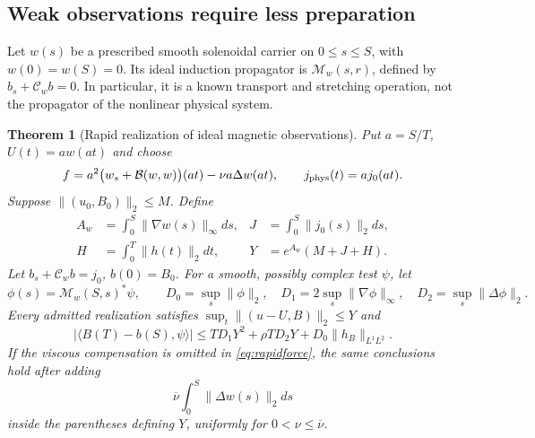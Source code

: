 \documentclass[11pt,a4paper]{amsart}
\newtheorem{theorem}{Theorem}[section]
\theoremstyle{definition}
\theoremstyle{remark}
\numberwithin{equation}{section}
\newcommand{\Bcal}{\mathcal B}
\newcommand{\Ccal}{\mathcal C}
\newcommand{\Mcal}{\mathcal M}
\newcommand{\ip}[2]{\langle #1,#2\rangle}
\newcommand{\norm}[1]{\lVert #1\rVert}
\newcommand{\abs}[1]{\lvert #1\rvert}
\begin{document}
\subsection{Weak observations require less preparation}
Let $w(s)$ be a prescribed smooth solenoidal carrier on $0\le s\le S$, with $w(0)=w(S)=0$. Its ideal induction propagator is $\Mcal_w(s,r)$, defined by $b_s+\Ccal_wb=0$. In particular, it is a known transport and stretching operation, not the propagator of the nonlinear physical system.

\begin{theorem}[Rapid realization of ideal magnetic observations]\label{thm:rapid}
Put $a=S/T$, $U(t)=aw(at)$ and choose
\begin{equation}\label{eq:rapidforce}
 f=a^2\big(w_s+\Bcal(w,w)\big)(at)-\nu a\Delta w(at),
 \qquad j_{\rm phys}(t)=a j_0(at).
\end{equation}
Suppose $\norm{(u_0,B_0)}_2\le M$. Define
\begin{align*}
 A_w&=\int_0^S\norm{\nabla w(s)}_\infty ds,&
 J&=\int_0^S\norm{j_0(s)}_2ds,\\
 H&=\int_0^T\norm{h(t)}_2dt,&
 Y&=e^{A_w}(M+J+H).
\end{align*}
Let $b_s+\Ccal_wb=j_0$, $b(0)=B_0$. For a smooth, possibly complex test $\psi$, let
\[
 \phi(s)=\Mcal_w(S,s)^*\psi,\qquad
 D_0=\sup_s\norm\phi_2,\quad
 D_1=2\sup_s\norm{\nabla\phi}_\infty,\quad
 D_2=\sup_s\norm{\Delta\phi}_2.
\]
Every admitted realization satisfies $\sup_t\norm{(u-U,B)}_2\le Y$ and
\begin{equation}\label{eq:rapiderror}
 \abs{\ip{B(T)-b(S)}\psi}
 \le TD_1Y^2+\rho TD_2Y+D_0\norm{h_B}_{L^1L^2}.
\end{equation}
If the viscous compensation is omitted in \eqref{eq:rapidforce}, the same conclusions hold after adding
\begin{equation}\label{eq:viscdefect}
 \overline\nu\int_0^S\norm{\Delta w(s)}_2ds
\end{equation}
inside the parentheses defining $Y$, uniformly for $0<\nu\le\overline\nu$.
\end{theorem}
\end{document}

